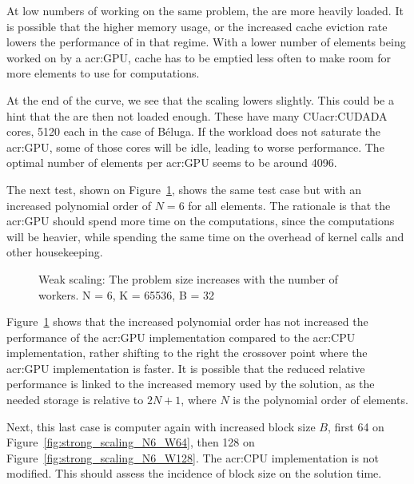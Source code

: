 At low numbers of  working on the same problem, the  are
more heavily loaded. It is possible that the higher memory usage, or the increased cache eviction
rate lowers the performance of  in that regime. With a lower number of elements
being worked on by a \acrshort{acr:GPU}, cache has to be emptied less often to make room for more
elements to use for computations.

At the end of the curve, we see that the scaling lowers slightly. This could be a hint that the
 are then not loaded enough. These  have many
CU\acrshort{acr:CUDA}DA cores, 5120 each in the case of Béluga. If the workload does not saturate
the \acrshort{acr:GPU}, some of those cores will be idle, leading to worse performance. The optimal
number of elements per \acrshort{acr:GPU} seems to be around 4096.

The next test, shown on Figure~\ref{fig:strong_scaling_N6_W32}, shows the same test case but with an
increased polynomial order of $N = 6$ for all elements. The rationale is that the \acrshort{acr:GPU}
should spend more time on the computations, since the computations will be heavier, while spending
the same time on the overhead of kernel calls and other housekeeping.

\begin{figure}[H]
	\centering
	
	\caption{Weak scaling: The problem size increases with the number of workers. N = 6, K = 65536, B = 32}
	\label{fig:strong_scaling_N6_W32}
\end{figure}

Figure~\ref{fig:strong_scaling_N6_W32} shows that the increased polynomial order has not increased
the performance of the \acrshort{acr:GPU} implementation compared to the \acrshort{acr:CPU}
implementation, rather shifting to the right the crossover point where the \acrshort{acr:GPU}
implementation is faster. It is possible that the reduced relative performance is linked to the
increased memory used by the solution, as the needed storage is relative to $2 N + 1$, where $N$ is
the polynomial order of elements.

Next, this last case is computer again with increased block size $B$, first 64 on
Figure~\ref{fig:strong_scaling_N6_W64}, then 128 on Figure~\ref{fig:strong_scaling_N6_W128}. The
\acrshort{acr:CPU} implementation is not modified. This should assess the incidence of block size on
the solution time.

